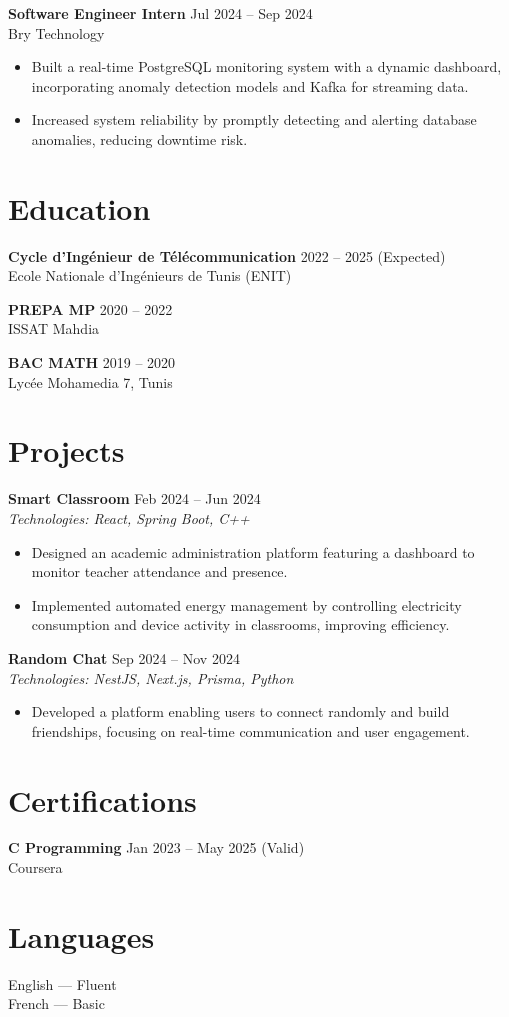 \documentclass[11pt,a4paper]{article}
\begin{document}
\textbf{Software Engineer Intern} \hfill Jul 2024 -- Sep 2024\\
Bry Technology\\
\begin{itemize}
    \item Built a real-time PostgreSQL monitoring system with a dynamic dashboard, incorporating anomaly detection models and Kafka for streaming data.
    \item Increased system reliability by promptly detecting and alerting database anomalies, reducing downtime risk.
\end{itemize}

\section*{Education}

\textbf{Cycle d'Ingénieur de Télécommunication} \hfill 2022 -- 2025 (Expected)\\
Ecole Nationale d'Ingénieurs de Tunis (ENIT)

\textbf{PREPA MP} \hfill 2020 -- 2022\\
ISSAT Mahdia

\textbf{BAC MATH} \hfill 2019 -- 2020\\
Lycée Mohamedia 7, Tunis

\section*{Projects}

\textbf{Smart Classroom} \hfill Feb 2024 -- Jun 2024\\
\textit{Technologies: React, Spring Boot, C++}\\
\begin{itemize}
    \item Designed an academic administration platform featuring a dashboard to monitor teacher attendance and presence.
    \item Implemented automated energy management by controlling electricity consumption and device activity in classrooms, improving efficiency.
\end{itemize}

\textbf{Random Chat} \hfill Sep 2024 -- Nov 2024\\
\textit{Technologies: NestJS, Next.js, Prisma, Python}\\
\begin{itemize}
    \item Developed a platform enabling users to connect randomly and build friendships, focusing on real-time communication and user engagement.
\end{itemize}

\section*{Certifications}
\textbf{C Programming} \hfill Jan 2023 -- May 2025 (Valid)\\
Coursera

\section*{Languages}
English --- Fluent \\
French --- Basic
\end{document}
